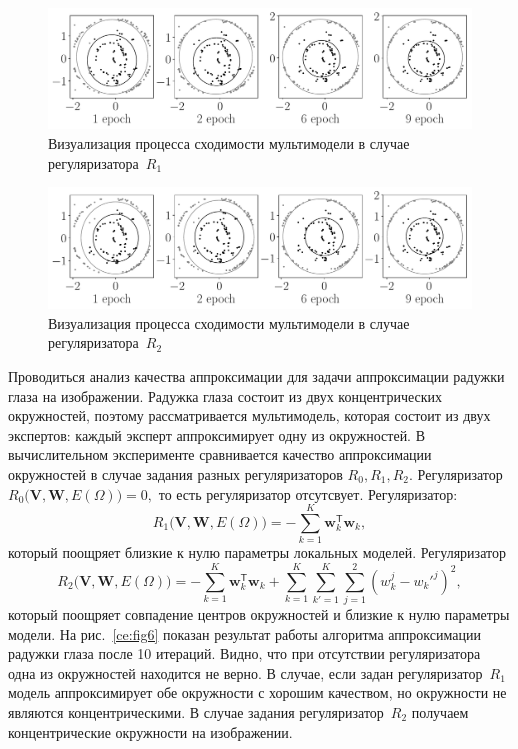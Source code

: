 \documentclass[12pt, twoside]{article}
\numberwithin{equation}{section}
\begin{document}
\begin{figure}
     \centering
     \includegraphics[width=\textwidth]{figures/experiment_real_prior}
     \caption{Визуализация процесса сходимости мультимодели в случае регуляризатора~$R_1$}
    \label{ce:fig8}
\end{figure}

\begin{figure}
     \centering
     \includegraphics[width=\textwidth]{figures/experiment_real_regular}
     \caption{Визуализация процесса сходимости мультимодели в случае регуляризатора~$R_2$}
    \label{ce:fig9}
\end{figure}

Проводиться анализ качества аппроксимации для задачи аппроксимации радужки глаза на изображении. Радужка глаза состоит из двух концентрических окружностей, поэтому рассматривается мультимодель, которая состоит из двух экспертов: каждый эксперт аппроксимирует одну из окружностей. В вычислительном эксперименте сравнивается качество аппроксимации окружностей в случае задания разных регуляризаторов $R_0, R_1, R_2$. Регуляризатор $R_0\bigl(\mathbf{V}, \mathbf{W}, E(\Omega)\bigr)=0,$ то есть регуляризатор отсутсвует. Регуляризатор:
\[
R_1\bigl(\mathbf{V}, \mathbf{W}, E(\Omega)\bigr)= -\sum_{k=1}^{K}\mathbf{w}_k^{\mathsf{T}}\mathbf{w}_k,
\]
который поощряет близкие к нулю параметры локальных моделей.
Регуляризатор
\[
R_2\bigl(\mathbf{V}, \mathbf{W}, E(\Omega)\bigr)= -\sum_{k=1}^{K}\mathbf{w}_k^{\mathsf{T}}\mathbf{w}_k + \sum_{k=1}^{K}\sum_{k'=1}^{K}\sum_{j=1}^2\left(w_k^j-w_k'^j\right)^2,\]
который поощряет совпадение центров окружностей и близкие к нулю параметры модели.
На рис.~\ref{ce:fig6} показан результат работы алгоритма аппроксимации радужки глаза после 10 итераций. Видно, что при отсутствии регуляризатора одна из окружностей находится не верно. В случае, если задан регуляризатор~$R_1$ модель аппроксимирует обе окружности с хорошим качеством, но окружности не являются концентрическими. В случае задания регуляризатор~$R_2$ получаем концентрические окружности на изображении.
\end{document}
